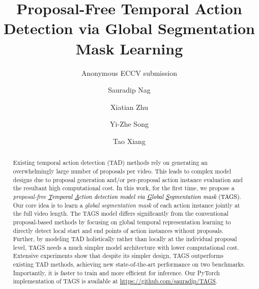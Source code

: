 \documentclass[runningheads]{llncs}
\newcommand{\shortmodelname}{TAGS}
\begin{document}
\pagestyle{headings}
\mainmatter
\def\ECCVSubNumber{100}  

\title{Proposal-Free Temporal Action Detection via Global Segmentation Mask Learning} 

\author{Anonymous ECCV submission}


\author{Sauradip Nag \and
Xiatian Zhu \and
Yi-Zhe Song \and
Tao Xiang}
\maketitle

\begin{abstract}
Existing temporal action detection (TAD) methods 
rely on generating an overwhelmingly large number of proposals per video. This leads to  complex model designs due to proposal generation and/or per-proposal action instance evaluation and the resultant high computational cost. In this work, for the first time, we propose a  {\em proposal-free} \textcolor{black}{{\em \underline{T}emporal  \underline{A}ction detection model via \underline{G}lobal \underline{S}egmentation mask} (\shortmodelname)}.  Our core idea is to learn a  {\em global segmentation mask} of each action instance jointly at the full video length.  The {\shortmodelname} model differs significantly from the conventional proposal-based methods by focusing on global temporal representation learning to directly detect local start and end points of action instances without proposals. Further, by modeling TAD holistically rather than locally at the individual proposal level,
{\shortmodelname} needs a much simpler model architecture with lower computational cost.
Extensive experiments show that despite its simpler design, {\shortmodelname}  outperforms existing TAD methods, achieving new state-of-the-art performance on two benchmarks. Importantly, it is   faster to train and   more efficient for inference. Our PyTorch implementation of {\shortmodelname} is available at \href{https://github.com/sauradip/TAGS}{https://github.com/sauradip/TAGS}.
\end{abstract}
\end{document}
